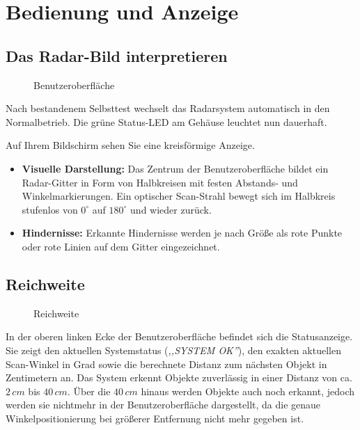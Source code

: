 %
%

\chapter{Bedienung und Anzeige}

\section{Das Radar-Bild interpretieren}
\begin{figure}[h]
	\centering
	
	\caption{Benutzeroberfläche}
\end{figure}

Nach bestandenem Selbsttest wechselt das Radarsystem automatisch in den Normalbetrieb. Die grüne Status-LED am Gehäuse leuchtet nun dauerhaft.

Auf Ihrem Bildschirm sehen Sie eine kreisförmige Anzeige.

\begin{itemize}
	\item \textbf{Visuelle Darstellung:} Das Zentrum der Benutzeroberfläche bildet ein Radar-Gitter in Form von Halbkreisen mit festen Abstands- und Winkelmarkierungen. Ein optischer Scan-Strahl bewegt sich im Halbkreis stufenlos von $0^\circ$ auf $180^\circ$ und wieder zurück.
	\item \textbf{Hindernisse:} Erkannte Hindernisse werden je nach Größe als rote Punkte oder rote Linien auf dem Gitter eingezeichnet.
\end{itemize}

\section{Reichweite}
\begin{figure}[h]
	\centering
	
	\caption{Reichweite}
\end{figure}
In der oberen linken Ecke der Benutzeroberfläche befindet sich die Statusanzeige. Sie zeigt den aktuellen Systemstatus (\textit{,,SYSTEM OK''}), den exakten aktuellen Scan-Winkel in Grad sowie die berechnete Distanz zum nächsten Objekt in Zentimetern an. Das System erkennt Objekte zuverlässig in einer Distanz von ca. $2\,cm$ bis $40\,cm$. Über die $40\,cm$ hinaus werden Objekte auch noch erkannt, jedoch werden sie nichtmehr in der Benutzeroberfläche dargestellt, da die genaue Winkelpositionierung bei größerer Entfernung nicht mehr gegeben ist. 
